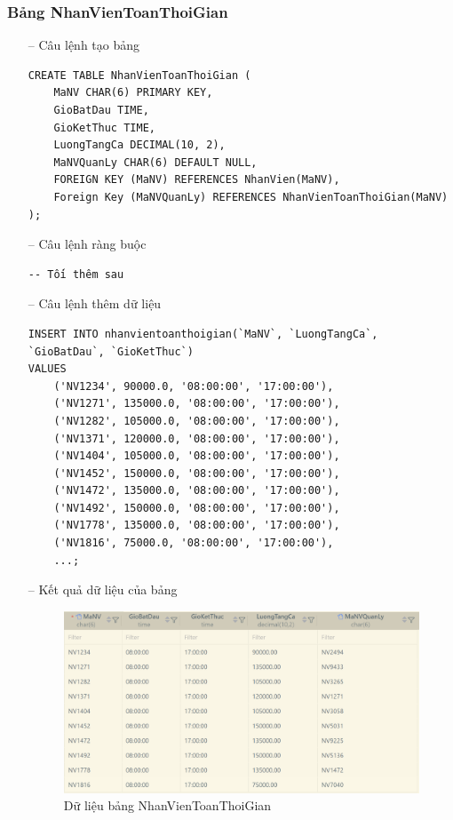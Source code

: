 \subsubsection{Bảng NhanVienToanThoiGian}
\begin{itemize}
    \item [--] Câu lệnh tạo bảng
    \begin{verbatim}
CREATE TABLE NhanVienToanThoiGian (
    MaNV CHAR(6) PRIMARY KEY,
    GioBatDau TIME,
    GioKetThuc TIME,
    LuongTangCa DECIMAL(10, 2),
    MaNVQuanLy CHAR(6) DEFAULT NULL,
    FOREIGN KEY (MaNV) REFERENCES NhanVien(MaNV),
    Foreign Key (MaNVQuanLy) REFERENCES NhanVienToanThoiGian(MaNV)
);
    \end{verbatim}
    \item [--] Câu lệnh ràng buộc
    \begin{verbatim}
-- Tối thêm sau
    \end{verbatim}
    \newpage
    \item [--] Câu lệnh thêm dữ liệu
    \begin{verbatim}
INSERT INTO nhanvientoanthoigian(`MaNV`, `LuongTangCa`, `GioBatDau`, `GioKetThuc`)
VALUES
    ('NV1234', 90000.0, '08:00:00', '17:00:00'),
    ('NV1271', 135000.0, '08:00:00', '17:00:00'),
    ('NV1282', 105000.0, '08:00:00', '17:00:00'),
    ('NV1371', 120000.0, '08:00:00', '17:00:00'),
    ('NV1404', 105000.0, '08:00:00', '17:00:00'),
    ('NV1452', 150000.0, '08:00:00', '17:00:00'),
    ('NV1472', 135000.0, '08:00:00', '17:00:00'),
    ('NV1492', 150000.0, '08:00:00', '17:00:00'),
    ('NV1778', 135000.0, '08:00:00', '17:00:00'),
    ('NV1816', 75000.0, '08:00:00', '17:00:00'),
    ...;
    \end{verbatim}
    \item [--] Kết quả dữ liệu của bảng
    \begin{figure}[H]
        \centering
        \includegraphics[width=\linewidth]{content/images/data_nvfulltime.png}
        \caption{Dữ liệu bảng NhanVienToanThoiGian}
        \label{fig:data_nvfulltime}
    \end{figure}
\end{itemize}
\newpage
